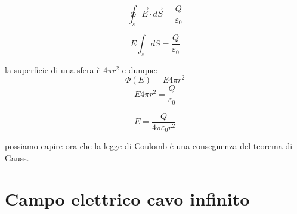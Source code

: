 \begin{equation*}
     \oint_s \vec{E}\cdot d\vec{S} = \frac{Q}{\varepsilon_0}
\end{equation*}

\begin{equation*}
     E\int_s dS = \frac{Q}{\varepsilon_0}
\end{equation*}

la superficie di una sfera è $4\pi r^2$ e dunque:
\begin{equation*}
    \Phi(E) = E4\pi r^2
\end{equation*}
\begin{equation*}
     E4\pi r^2 = \frac{Q}{\varepsilon_0}
\end{equation*}

\begin{equation*}
     E = \frac{Q}{4\pi\varepsilon_0r^2}
\end{equation*}

possiamo capire ora che la legge di Coulomb è una conseguenza del teorema di Gauss.



\section{Campo elettrico cavo infinito}
\label{paginaCampoElettricoCavoInfinito}


